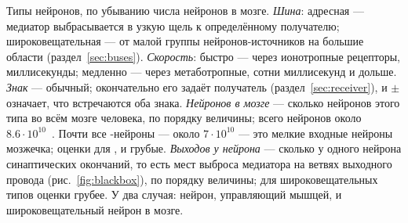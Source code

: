 \begin{table}[t]
\caption{Типы нейронов, по убыванию числа нейронов в мозге. \emph{Шина}: адресная --- медиатор выбрасывается в узкую щель к определённому получателю; широковещательная --- от малой группы нейронов-источников на большие области (раздел~\ref{sec:buses}). \emph{Скорость}: быстро --- через ионотропные рецепторы, миллисекунды; медленно --- через метаботропные, сотни миллисекунд и дольше. \emph{Знак} --- обычный; окончательно его задаёт получатель (раздел~\ref{sec:receiver}), и $\pm$ означает, что встречаются оба знака. \emph{Нейронов в мозге} --- сколько нейронов этого типа во всём мозге человека, по порядку величины; всего нейронов около $8.6\cdot10^{10}$~\cite{Azevedo2009}. Почти все -нейроны --- около $7\cdot10^{10}$ --- это мелкие входные нейроны мозжечка; оценки для ,  и  грубые. \emph{Выходов у нейрона} --- сколько у одного нейрона синаптических окончаний, то есть мест выброса медиатора на ветвях выходного провода (рис.~\ref{fig:blackbox}), по порядку величины; для широковещательных типов оценки грубее. У  два случая: нейрон, управляющий мышцей, и широковещательный нейрон в мозге.}
\label{tab:types}
\end{table}

